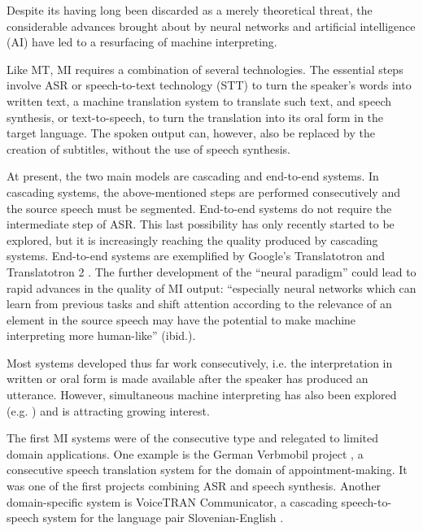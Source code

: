 Despite its having long been discarded as a merely theoretical threat, the considerable advances brought about by neural networks and artificial intelligence (AI) have led to a resurfacing of machine interpreting.

Like MT, MI requires a combination of several technologies. The essential steps involve ASR or speech-to-text technology (STT) to turn the speaker's words into written text, a machine translation system to translate such text, and speech synthesis, or text-to-speech, to turn the translation into its oral form in the target language. The spoken output can, however, also be replaced by the creation of subtitles, without the use of speech synthesis.

At present, the two main models are cascading and end-to-end systems. In cascading systems, the above-mentioned steps are performed consecutively and the source speech must be segmented. End-to-end systems do not require the intermediate step of ASR. This last possibility has only recently started to be explored, but it is increasingly reaching the quality produced by cascading systems. End-to-end systems are exemplified by Google's Translatotron \citep{jia2019direct} and Translatotron 2 \citep{jia2022translatotron}. The further development of the ``neural paradigm'' \citep[296]{braun_technology_2020} could lead to rapid advances in the quality of MI output: ``especially neural networks which can learn from previous tasks and shift attention according to the relevance of an element in the source speech may have the potential to make machine interpreting more human-like'' (ibid.).

Most systems developed thus far work consecutively, i.e. the interpretation in written or oral form is made available after the speaker has produced an utterance. However, simultaneous machine interpreting has also been explored (e.g. \citealt{cho2013real}) and is attracting growing interest.

The first MI systems were of the consecutive type and relegated to limited domain applications. One example is the German Verbmobil project \citep{wahlster2013verbmobil}, a consecutive speech translation system for the domain of appointment-making. It was one of the first projects combining ASR and speech synthesis. Another domain-specific system is VoiceTRAN Communicator, a cascading speech-to-speech system for the language pair Slovenian-English \citep{vzganec2005voicetran}.

